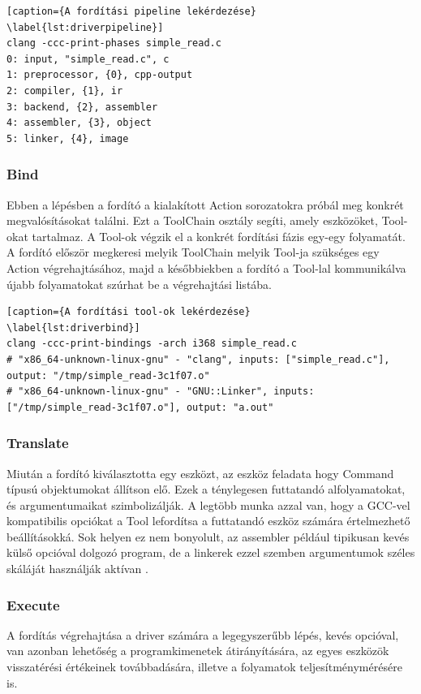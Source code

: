 \documentclass[a4paper,12pt]{report}
\begin{document}
\begin{minipage}{\linewidth}
\begin{lstlisting}[caption={A fordítási pipeline lekérdezése}
\label{lst:driverpipeline}]
clang -ccc-print-phases simple_read.c 
0: input, "simple_read.c", c
1: preprocessor, {0}, cpp-output
2: compiler, {1}, ir
3: backend, {2}, assembler
4: assembler, {3}, object
5: linker, {4}, image
\end{lstlisting}
\end{minipage}

\subsubsection{Bind}
Ebben a lépésben a fordító a kialakított Action sorozatokra próbál meg konkrét megvalósításokat találni. Ezt a ToolChain osztály segíti, amely eszközöket, Tool-okat tartalmaz. A Tool-ok végzik el a konkrét fordítási fázis egy-egy folyamatát. A fordító először megkeresi melyik ToolChain melyik Tool-ja szükséges egy Action végrehajtásához, majd a későbbiekben a fordító a Tool-lal kommunikálva újabb folyamatokat szúrhat be a végrehajtási listába.

\begin{minipage}{\linewidth}
\begin{lstlisting}[caption={A fordítási tool-ok lekérdezése}
\label{lst:driverbind}]
clang -ccc-print-bindings -arch i368 simple_read.c
# "x86_64-unknown-linux-gnu" - "clang", inputs: ["simple_read.c"], output: "/tmp/simple_read-3c1f07.o"
# "x86_64-unknown-linux-gnu" - "GNU::Linker", inputs: ["/tmp/simple_read-3c1f07.o"], output: "a.out"
\end{lstlisting}
\end{minipage}

\subsubsection{Translate}
Miután a fordító kiválasztotta egy eszközt, az eszköz feladata hogy Command típusú objektumokat állítson elő. Ezek a ténylegesen futtatandó alfolyamatokat, és argumentumaikat szimbolizálják. A legtöbb munka azzal van, hogy a GCC-vel kompatibilis opciókat a Tool lefordítsa a futtatandó eszköz számára értelmezhető beállításokká. Sok helyen ez nem bonyolult, az assembler például tipikusan kevés külső opcióval dolgozó program, de a linkerek ezzel szemben argumentumok széles skáláját használják aktívan \cite{clangdriverinternals}.

\subsubsection{Execute}
A fordítás végrehajtása a driver számára a legegyszerűbb lépés, kevés opcióval, van azonban lehetőség a programkimenetek átirányítására, az egyes eszközök visszatérési értékeinek továbbadására, illetve a folyamatok teljesítménymérésére is.
\end{document}
